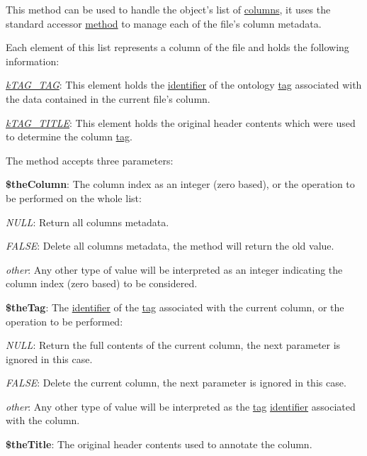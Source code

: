 This method can be used to handle the object's list of \hyperlink{}{columns}, it uses the standard accessor \hyperlink{class_c_attribute_ace756c1a8832932ec135104223d1e50c}{method} to manage each of the file's column metadata.

Each element of this list represents a column of the file and holds the following information\-:


\begin{DoxyItemize}
\item {\itshape \hyperlink{}{k\-T\-A\-G\-\_\-\-T\-A\-G}}\-: This element holds the \hyperlink{}{identifier} of the ontology \hyperlink{class_c_ontology_tag}{tag} associated with the data contained in the current file's column. 
\item {\itshape \hyperlink{}{k\-T\-A\-G\-\_\-\-T\-I\-T\-L\-E}}\-: This element holds the original header contents which were used to determine the column \hyperlink{class_c_ontology_tag}{tag}. 
\end{DoxyItemize}

The method accepts three parameters\-:


\begin{DoxyItemize}
\item {\bfseries \$the\-Column}\-: The column index as an integer (zero based), or the operation to be performed on the whole list\-: 
\begin{DoxyItemize}
\item {\itshape N\-U\-L\-L}\-: Return all columns metadata. 
\item {\itshape F\-A\-L\-S\-E}\-: Delete all columns metadata, the method will return the old value. 
\item {\itshape other}\-: Any other type of value will be interpreted as an integer indicating the column index (zero based) to be considered. 
\end{DoxyItemize}
\item {\bfseries \$the\-Tag}\-: The \hyperlink{}{identifier} of the \hyperlink{class_c_ontology_tag}{tag} associated with the current column, or the operation to be performed\-: 
\begin{DoxyItemize}
\item {\itshape N\-U\-L\-L}\-: Return the full contents of the current column, the next parameter is ignored in this case. 
\item {\itshape F\-A\-L\-S\-E}\-: Delete the current column, the next parameter is ignored in this case. 
\item {\itshape other}\-: Any other type of value will be interpreted as the \hyperlink{class_c_ontology_tag}{tag} \hyperlink{}{identifier} associated with the column. 
\end{DoxyItemize}
\item {\bfseries \$the\-Title}\-: The original header contents used to annotate the column. 
\end{DoxyItemize}


